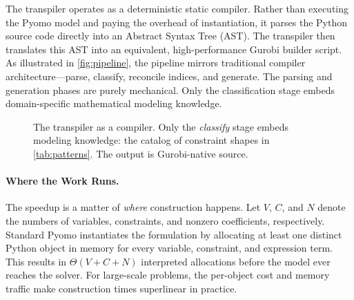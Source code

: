 \documentclass[runningheads]{llncs}
\begin{document}
The transpiler operates as a deterministic static compiler. Rather than executing the Pyomo model and paying the overhead of instantiation, it parses the Python source code directly into an Abstract Syntax Tree (AST). The transpiler then translates this AST into an equivalent, high-performance Gurobi builder script. As illustrated in \autoref{fig:pipeline}, the pipeline mirrors traditional compiler architecture—parse, classify, reconcile indices, and generate. The parsing and generation phases are purely mechanical. Only the classification stage embeds domain-specific mathematical modeling knowledge.
\begin{figure}[tb]
\centering
{}
\caption{The transpiler as a compiler. Only the \emph{classify} stage embeds modeling knowledge: the catalog of constraint shapes in \autoref{tab:patterns}. The output is Gurobi-native source.}
\label{fig:pipeline}
\end{figure}

\paragraph{Where the Work Runs.} The speedup is a matter of \emph{where} construction happens. Let $V$, $C$, and $N$ denote the numbers of variables, constraints, and nonzero coefficients, respectively. Standard Pyomo instantiates the formulation by allocating at least one distinct Python object in memory for every variable, constraint, and expression term. This results in $\Theta(V + C + N)$ interpreted allocations before the model ever reaches the solver. For large-scale problems, the per-object cost and memory traffic make construction times superlinear in practice.
\end{document}
